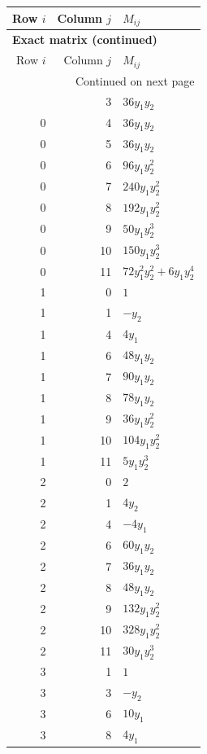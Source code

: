 \documentclass[10pt,a4paper]{article}
\begin{document}
{\small\setlength{\tabcolsep}{7pt}\begin{longtable}{rrp{125mm}}
\toprule Row $i$ & Column $j$ & $M_{ij}$\\\midrule\endfirsthead
\multicolumn{3}{l}{\textbf{Exact matrix (continued)}}\\
\toprule Row $i$ & Column $j$ & $M_{ij}$\\\midrule\endhead
\midrule\multicolumn{3}{r}{Continued on next page}\\\endfoot\bottomrule\endlastfoot
0 & 3 & $36 y_{1} y_{2}$\\
0 & 4 & $36 y_{1} y_{2}$\\
0 & 5 & $36 y_{1} y_{2}$\\
0 & 6 & $96 y_{1} y_{2}^{2}$\\
0 & 7 & $240 y_{1} y_{2}^{2}$\\
0 & 8 & $192 y_{1} y_{2}^{2}$\\
0 & 9 & $50 y_{1} y_{2}^{3}$\\
0 & 10 & $150 y_{1} y_{2}^{3}$\\
0 & 11 & $72 y_{1}^{2} y_{2}^{2} + 6 y_{1} y_{2}^{4}$\\
1 & 0 & $1$\\
1 & 1 & $- y_{2}$\\
1 & 4 & $4 y_{1}$\\
1 & 6 & $48 y_{1} y_{2}$\\
1 & 7 & $90 y_{1} y_{2}$\\
1 & 8 & $78 y_{1} y_{2}$\\
1 & 9 & $36 y_{1} y_{2}^{2}$\\
1 & 10 & $104 y_{1} y_{2}^{2}$\\
1 & 11 & $5 y_{1} y_{2}^{3}$\\
2 & 0 & $2$\\
2 & 1 & $4 y_{2}$\\
2 & 4 & $- 4 y_{1}$\\
2 & 6 & $60 y_{1} y_{2}$\\
2 & 7 & $36 y_{1} y_{2}$\\
2 & 8 & $48 y_{1} y_{2}$\\
2 & 9 & $132 y_{1} y_{2}^{2}$\\
2 & 10 & $328 y_{1} y_{2}^{2}$\\
2 & 11 & $30 y_{1} y_{2}^{3}$\\
3 & 1 & $1$\\
3 & 3 & $- y_{2}$\\
3 & 6 & $10 y_{1}$\\
3 & 8 & $4 y_{1}$\\

\end{longtable}}
\end{document}
